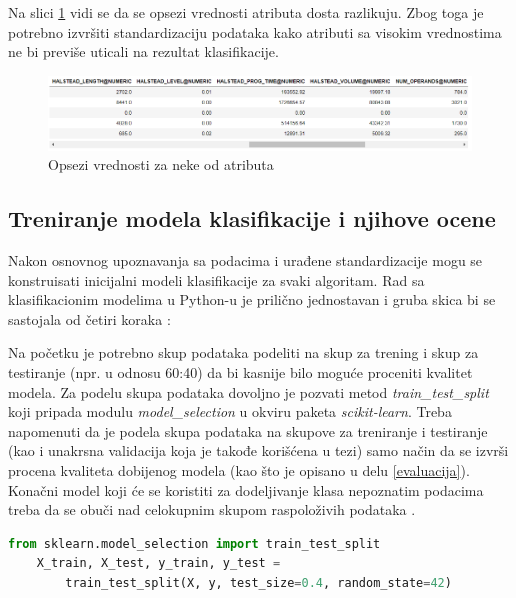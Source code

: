 \documentclass[12pt,oneside]{memoir}
\begin{document}
Na slici \ref{fig:atr_opsezi} vidi se da se opsezi vrednosti atributa dosta razlikuju. Zbog toga je potrebno izvršiti standardizaciju podataka kako atributi sa visokim vrednostima ne bi previše uticali na rezultat klasifikacije. 

\begin{figure}[!ht]
  \centering
  \includegraphics[width=1\textwidth]{atr_opsezi.png}
  \caption{Opsezi vrednosti za neke od atributa}
  \label{fig:atr_opsezi}
\end{figure}

\subsection{Treniranje modela klasifikacije i njihove ocene}

Nakon osnovnog upoznavanja sa podacima i urađene standardizacije mogu se konstruisati inicijalni modeli klasifikacije za svaki algoritam. Rad sa klasifikacionim modelima u Python-u je prilično jednostavan i gruba skica bi se sastojala od četiri koraka \cite{scikit-learn}:

Na početku je potrebno skup podataka podeliti na skup za trening i skup za testiranje (npr. u odnosu 60:40) da bi kasnije bilo moguće proceniti kvalitet modela. Za podelu skupa podataka dovoljno je pozvati metod \textit{train\_test\_split} koji pripada modulu \textit{model\_selection} u okviru paketa \textit{scikit-learn}. Treba napomenuti da je podela skupa podataka na skupove za treniranje i testiranje (kao i unakrsna validacija koja je takođe korišćena u tezi) samo način da se izvrši procena kvaliteta dobijenog modela (kao što je opisano u delu \ref{evaluacija}). Konačni model koji će se koristiti za dodeljivanje klasa nepoznatim podacima treba da se obuči nad celokupnim skupom raspoloživih podataka \cite{mladen}.

\begin{lstlisting}[language=Python, basicstyle=\tiny]
	from sklearn.model_selection import train_test_split
	X_train, X_test, y_train, y_test = 
		train_test_split(X, y, test_size=0.4, random_state=42)
\end{lstlisting}
\end{document}
